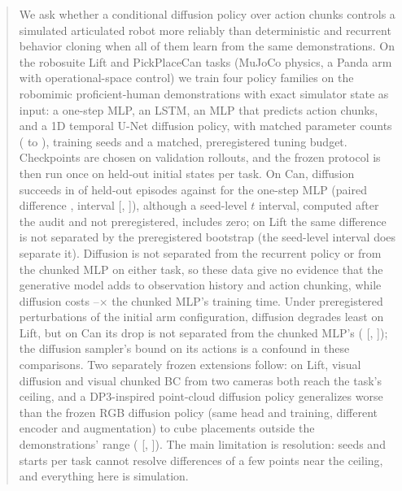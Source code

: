 \begin{abstract}
We ask whether a conditional diffusion policy over action chunks controls a simulated
articulated robot more reliably than deterministic and recurrent behavior cloning when all
of them learn from the same demonstrations. On the robosuite Lift and PickPlaceCan tasks
(MuJoCo physics, a Panda arm with operational-space control) we train four policy families
on the robomimic proficient-human demonstrations with exact simulator state as input: a
one-step MLP, an LSTM, an MLP that predicts action chunks, and a 1D temporal U-Net
diffusion policy, with matched parameter counts ( to ),
 training seeds
and a matched, preregistered tuning budget. Checkpoints are chosen on validation rollouts,
and the frozen protocol is then run once on  held-out initial states per
task. On Can, diffusion succeeds in \pct{} of held-out episodes against
\pct{} for the one-step MLP (paired difference
\pp, \pct{} interval
[, ]), although a seed-level $t$
interval, computed after the audit and not preregistered, includes zero; on Lift the same
difference is not separated by the preregistered bootstrap (the seed-level interval does
separate it). Diffusion is not separated from the recurrent policy or from the
chunked MLP on either task, so these data give no evidence that the generative model adds to
observation history and action chunking, while diffusion costs
--$\times$ the chunked MLP's training time.
Under preregistered perturbations of the initial arm configuration, diffusion degrades least
on Lift, but on Can its drop is not separated from the chunked MLP's
(\pp{} [,
]); the diffusion sampler's bound on its actions is a
confound in these comparisons. Two separately frozen extensions follow: on Lift, visual diffusion and visual
chunked BC from two cameras both reach the task's ceiling, and a DP3-inspired point-cloud
diffusion policy generalizes worse than the frozen RGB diffusion policy (same head and
training, different encoder and augmentation) to cube placements
outside the demonstrations' range (\pp{} [, ]). The
main limitation is resolution:  seeds and  starts per
task cannot resolve differences of a few points near the ceiling, and everything here is
simulation.
\end{abstract}
